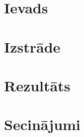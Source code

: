 \documentclass[12pt,a4paper,oneside]{article}
\begin{document}



\clearpage
\tableofcontents
\clearpage

\newpage
\section{Ievads}


\newpage
\section{Izstrāde}


\newpage
\section{Rezultāts}


\newpage
\section{Secinājumi}


\newpage
\printbibliography

\newpage
\appendix

\end{document}
